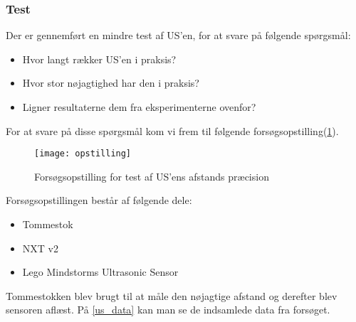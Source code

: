 \subsubsection{Test}
Der er gennemført en mindre test af US'en, for at svare på følgende spørgsmål:

\begin{itemize}
\item Hvor langt rækker US'en i praksis?
\item Hvor stor nøjagtighed har den i praksis?
\item Ligner resultaterne dem fra eksperimenterne ovenfor?
\end{itemize}

For at svare på disse spørgsmål kom vi frem til følgende forsøgsopstilling(\ref{opstilling}).

\begin{figure}[h]
\centering
\texttt{[image: opstilling]}
\caption{Forsøgsopstilling for test af US'ens afstands præcision}
\label{opstilling}
\end{figure}

Forsøgsopstillingen består af følgende dele:
\begin{itemize}
\item Tommestok
\item NXT v2
\item Lego Mindstorms Ultrasonic Sensor
\end{itemize}

Tommestokken blev brugt til at måle den nøjagtige afstand og derefter blev sensoren aflæst.
På \ref{us_data} kan man se de indsamlede data fra forsøget.

